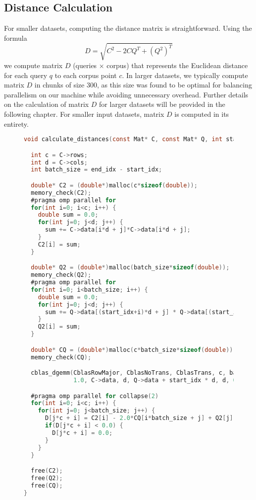 \documentclass{article}
\begin{document}
\subsection{Distance Calculation}
For smaller datasets, computing the distance matrix is straightforward. Using the formula 
\begin{equation}
    D = \sqrt{C^2 - 2 C Q^T + (Q^2)^T}
\end{equation}
we compute matrix \( D \) (queries $\times$ corpus) that represents the Euclidean distance for each query \( q \) to each corpus point \( c \). In larger datasets, we typically compute matrix \( D \) in chunks of size 300, as this size was found to be optimal for balancing parallelism on our machine while avoiding unnecessary overhead. Further details on the calculation of matrix \( D \) for larger datasets will be provided in the following chapter. For smaller input datasets, matrix \( D \) is computed in its entirety.


\begin{figure}[H]
\begin{lstlisting}[language=C, caption={Calculating distances using CBLAS}]
void calculate_distances(const Mat* C, const Mat* Q, int start_idx, int end_idx, long double* D) {

  int c = C->rows;
  int d = C->cols;
  int batch_size = end_idx - start_idx;

  double* C2 = (double*)malloc(c*sizeof(double));
  memory_check(C2);
  #pragma omp parallel for
  for(int i=0; i<c; i++) {
    double sum = 0.0;
    for(int j=0; j<d; j++) {
      sum += C->data[i*d + j]*C->data[i*d + j];
    }
    C2[i] = sum;
  }

  double* Q2 = (double*)malloc(batch_size*sizeof(double));
  memory_check(Q2);
  #pragma omp parallel for
  for(int i=0; i<batch_size; i++) {
    double sum = 0.0;
    for(int j=0; j<d; j++) {
      sum += Q->data[(start_idx+i)*d + j] * Q->data[(start_idx+i)*d + j];
    }
    Q2[i] = sum;
  }

  double* CQ = (double*)malloc(c*batch_size*sizeof(double));
  memory_check(CQ);

  cblas_dgemm(CblasRowMajor, CblasNoTrans, CblasTrans, c, batch_size, d,
              1.0, C->data, d, Q->data + start_idx * d, d, 0.0, CQ, batch_size);

  #pragma omp parallel for collapse(2)
  for(int i=0; i<c; i++) {
    for(int j=0; j<batch_size; j++) {
      D[j*c + i] = C2[i] - 2.0*CQ[i*batch_size + j] + Q2[j];
      if(D[j*c + i] < 0.0) {
        D[j*c + i] = 0.0;
      }
    }
  }

  free(C2);
  free(Q2);
  free(CQ);
}
\end{lstlisting}
\end{figure}
\end{document}
